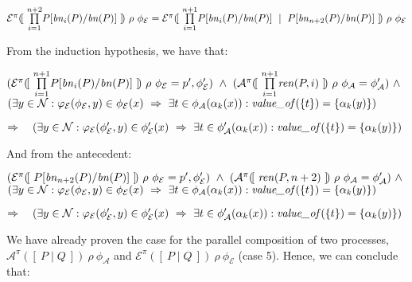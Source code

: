\documentclass[10pt,a4paper,final,oneside,fleqn]{book}
\begin{document}
\noindent
$\mathcal{E}^\pi(\![~\underset{i=1}{\overset{n+2}{\prod}}P[\mbox{{\itshape bn\/}}_i(P)/\mbox{{\itshape bn\/}}(P)]~]\!)~\rho~\phi_\mathcal{E}=\mathcal{E}^\pi(\![~\underset{i=1}{\overset{n+1}{\prod}}P[\mbox{{\itshape bn\/}}_i(P)/\mbox{{\itshape bn\/}}(P)]~\mid~P[\mbox{{\itshape bn\/}}_{n+2}(P)/\mbox{{\itshape bn\/}}(P)]~]\!)~\rho~\phi_\mathcal{E}$\vspace{5mm}

\noindent
From the induction hypothesis, we have that:

\noindent
$(\mathcal{E}^\pi(\![~\underset{i=1}{\overset{n+1}{\prod}}P[\mbox{{\itshape bn\/}}_i(P)/\mbox{{\itshape bn\/}}(P)]~]\!)~\rho~\phi_\mathcal{E}=p',\phi'_\mathcal{E})~\wedge~(\mathcal{A}^\pi(\![~\underset{i=1}{\overset{n+1}{\prod}}\mbox{{\itshape ren\/}}(P,i)~]\!)~\rho~\phi_\mathcal{A}=\phi'_\mathcal{A})~\wedge$\\
$(\exists y\in\mathcal{N}:\varphi_\mathcal{E}(\phi_\mathcal{E},y)\in\phi_\mathcal{E}(x)~\Rightarrow~\exists t\in\phi_\mathcal{A}(\alpha_k(x)):\mbox{{\itshape value\_of\/}}(\{t\})=\{\alpha_k(y)\})$\vspace{5mm}

\noindent
$\Rightarrow~~~(\exists y\in\mathcal{N}:\varphi_\mathcal{E}(\phi'_\mathcal{E},y)\in\phi'_\mathcal{E}(x)~\Rightarrow~\exists t\in\phi'_\mathcal{A}(\alpha_k(x)):\mbox{{\itshape value\_of\/}}(\{t\})=\{\alpha_k(y)\})$\vspace{5mm}

\noindent
And from the antecedent:

\noindent
$(\mathcal{E}^\pi(\![~P[\mbox{{\itshape bn\/}}_{n+2}(P)/\mbox{{\itshape bn\/}}(P)]~]\!)~\rho~\phi_\mathcal{E}=p',\phi'_\mathcal{E})~\wedge~(\mathcal{A}^\pi(\![~\mbox{{\itshape ren\/}}(P,{n+2})~]\!)~\rho~\phi_\mathcal{A}=\phi'_\mathcal{A})~\wedge$\\
$(\exists y\in\mathcal{N}:\varphi_\mathcal{E}(\phi_\mathcal{E},y)\in\phi_\mathcal{E}(x)~\Rightarrow~\exists t\in\phi_\mathcal{A}(\alpha_k(x)):\mbox{{\itshape value\_of\/}}(\{t\})=\{\alpha_k(y)\})$\vspace{5mm}

\noindent
$\Rightarrow~~~(\exists y\in\mathcal{N}:\varphi_\mathcal{E}(\phi'_\mathcal{E},y)\in\phi'_\mathcal{E}(x)~\Rightarrow~\exists t\in\phi'_\mathcal{A}(\alpha_k(x)):\mbox{{\itshape value\_of\/}}(\{t\})=\{\alpha_k(y)\})$

\noindent
We have already proven the case for the parallel composition of two processes,\\$\mathcal{A}^\pi(\![~P\mid Q~]\!)~\rho~\phi_\mathcal{A}$ and $\mathcal{E}^\pi(\![~P\mid Q~]\!)~\rho~\phi_\mathcal{E}$ (case 5).  Hence, we can conclude that:
\end{document}
